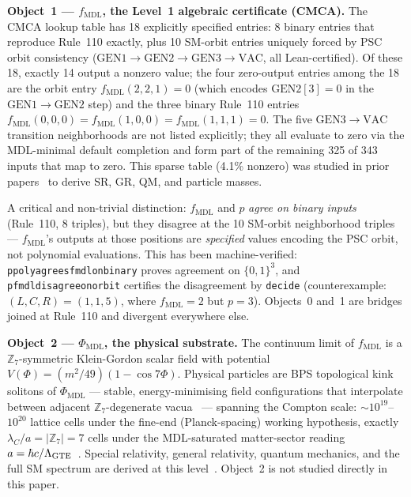 \documentclass[11pt]{article}
\theoremstyle{remark}
\newcommand{\PHIMDL}{\ensuremath{\Phi_{\mathrm{MDL}}}}
\newcommand{\ZS}{\ensuremath{\mathbb{Z}_7}}
\newcommand{\lean}[1]{%
  \penalty-100
  \begingroup\def\_{\textunderscore\allowbreak}\texttt{#1}\endgroup}
\newcommand{\fmdl}{\ensuremath{f_{\mathrm{MDL}}}}
\begin{document}
\medskip
\noindent\textbf{Object~1 --- $\fmdl{}$, the Level~1 algebraic certificate
(CMCA).}
The CMCA lookup table has 18 explicitly specified entries: 8 binary entries
that reproduce Rule~110 exactly, plus 10 SM-orbit entries uniquely forced by
PSC orbit consistency ($\mathrm{GEN}1 \to \mathrm{GEN}2 \to \mathrm{GEN}3 \to
\mathrm{VAC}$, all Lean-certified). Of these 18, exactly 14 output a nonzero
value; the four zero-output entries among the 18 are the orbit entry
$\fmdl{}(2,2,1) = 0$ (which encodes $\mathrm{GEN2}[3] = 0$ in the
$\mathrm{GEN}1 \to \mathrm{GEN}2$ step) and the three binary Rule~110
entries $\fmdl{}(0,0,0) = \fmdl{}(1,0,0) = \fmdl{}(1,1,1) = 0$.
The five $\mathrm{GEN}3 \to \mathrm{VAC}$ transition neighborhoods are
not listed explicitly; they all evaluate to zero via the MDL-minimal
default completion and form part of the remaining 325 of 343 inputs
that map to zero. This sparse table (4.1\% nonzero) was studied
in prior papers~\cite{SpivackCMCA,SpivackThreeTapeCMCA} to derive SR, GR,
QM, and particle masses.

A critical and non-trivial distinction: $\fmdl{}$ and $p$ \emph{agree on
binary inputs} (Rule~110, 8 triples), but they disagree at the 10 SM-orbit
neighborhood triples --- $\fmdl{}$'s outputs at those positions are
\emph{specified} values encoding the PSC orbit, not polynomial evaluations.
This has been machine-verified: \lean{p\_poly\_agrees\_fmdl\_on\_binary} proves
agreement on $\{0,1\}^3$, and \lean{p\_fmdl\_disagree\allowbreak\_on\_orbit}
certifies the disagreement by \texttt{decide} (counterexample: $(L,C,R) = (1,1,5)$,
where $\fmdl{} = 2$ but $p = 3$). Objects~0 and~1 are bridges joined at Rule~110
and divergent everywhere else.

\medskip
\noindent\textbf{Object~2 --- $\PHIMDL{}$, the physical substrate.}
The continuum limit of $\fmdl{}$ is a $\ZS$-symmetric Klein-Gordon scalar field
with potential $V(\Phi) = (m^2/49)(1-\cos 7\Phi)$. Physical particles are
BPS topological kink solitons of $\PHIMDL{}$ --- stable, energy-minimising
field configurations that interpolate between adjacent $\ZS$-degenerate
vacua~\cite{SpivackPhiMDLField} --- spanning the Compton scale:
${\sim}10^{19}$--$10^{20}$ lattice cells under the fine-end (Planck-spacing)
working hypothesis, exactly $\lambda_C/a = |\ZS| = 7$ cells under the
MDL-saturated matter-sector reading
$a = \hbar c/\Lambda_{\rm GTE}$~\cite{SpivackSpin7Lattice}.
Special relativity, general relativity, quantum
mechanics, and the full SM spectrum are derived at this
level~\cite{SpivackPhiMDLField,SpivackCompleteness,SpivackThreeTapeCMCA,
SpivackGTECosmology}. Object~2 is not studied directly in this paper.
\end{document}
